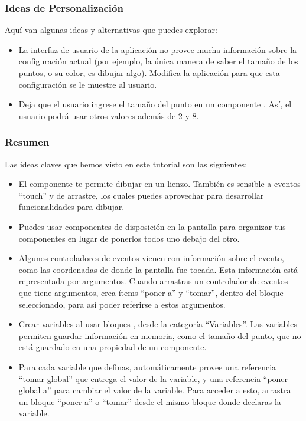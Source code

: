 \subsubsection*{Ideas de Personalización}

Aquí van algunas ideas y alternativas que puedes explorar:

\begin{itemize}

\item La interfaz de usuario de la aplicación no provee mucha
  información sobre la configuración actual (por ejemplo, la única
  manera de saber el tamaño de los puntos, o su color, es dibujar
  algo). Modifica la aplicación para que esta configuración se le
  muestre al usuario.

\item Deja que el usuario ingrese el tamaño del punto en un componente
  . Así, el usuario podrá usar otros valores
  además de 2 y 8.
\end{itemize}

\subsubsection*{Resumen}

Las ideas claves que hemos visto en este tutorial son las siguientes:

\begin{itemize}

\item El componente  te permite dibujar en un
  lienzo. También es sensible a eventos ``touch'' y de arrastre, los
  cuales puedes aprovechar para desarrollar funcionalidades para
  dibujar.

\item Puedes usar componentes de disposición en la pantalla para
  organizar tus componentes en lugar de ponerlos todos uno debajo del
  otro.

\item Algunos controladores de eventos vienen con información sobre el
  evento, como las coordenadas de donde la pantalla fue tocada. Esta
  información está representada por argumentos. Cuando arrastras un
  controlador de eventos que tiene argumentos, \AppInventor crea ítems
  ``poner a'' y ``tomar'', dentro del bloque seleccionado, para así
  poder referirse a estos argumentos.

\item Crear variables al usar bloques ,
  desde la categoría ``Variables''. Las variables permiten guardar
  información en memoria, como el tamaño del punto, que no está
  guardado en una propiedad de un componente.

\item Para cada variable que definas, \AppInventor automáticamente
  provee una referencia ``tomar global'' que entrega el valor de la
  variable, y una referencia ``poner global a'' para cambiar el valor
  de la variable. Para acceder a esto, arrastra un bloque ``poner a''
  o ``tomar'' desde el mismo bloque donde declaras la variable.
\end{itemize}

